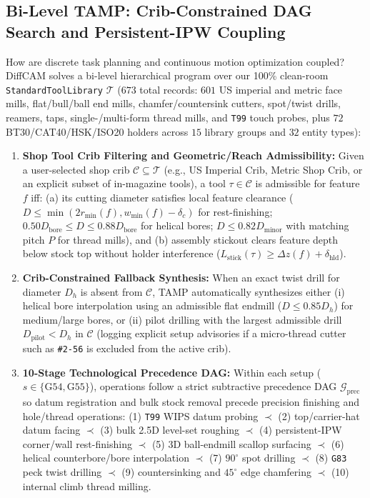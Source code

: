 \documentclass[conference]{IEEEtran}
\begin{document}
\subsection{Bi-Level TAMP: Crib-Constrained DAG Search and Persistent-IPW Coupling}
\label{sec:tamp}
How are discrete task planning and continuous motion optimization coupled? DiffCAM solves a bi-level hierarchical program over our 100\% clean-room \texttt{StandardToolLibrary} $\mathcal{T}$ ($673$ total records: $601$ US imperial and metric face mills, flat/bull/ball end mills, chamfer/countersink cutters, spot/twist drills, reamers, taps, single-/multi-form thread mills, and \texttt{T99} touch probes, plus $72$ BT30/CAT40/HSK/ISO20 holders across $15$ library groups and $32$ entity types):
\begin{enumerate}
  \item \textbf{Shop Tool Crib Filtering and Geometric/Reach Admissibility:} Given a user-selected shop crib $\mathcal{C} \subseteq \mathcal{T}$ (e.g., US Imperial Crib, Metric Shop Crib, or an explicit subset of in-magazine tools), a tool $\tau \in \mathcal{C}$ is admissible for feature $f$ iff: (a) its cutting diameter satisfies local feature clearance ($D \le \min(2 r_{\min}(f), w_{\min}(f) - \delta_c)$ for rest-finishing; $0.50 D_{\text{bore}} \le D \le 0.88 D_{\text{bore}}$ for helical bores; $D \le 0.82 D_{\text{minor}}$ with matching pitch $P$ for thread mills), and (b) assembly stickout clears feature depth below stock top without holder interference ($L_{\text{stick}}(\tau) \ge \Delta z(f) + \delta_{\text{hld}}$).
  \item \textbf{Crib-Constrained Fallback Synthesis:} When an exact twist drill for diameter $D_h$ is absent from $\mathcal{C}$, TAMP automatically synthesizes either (i) helical bore interpolation using an admissible flat endmill ($D \le 0.85 D_h$) for medium/large bores, or (ii) pilot drilling with the largest admissible drill $D_{\text{pilot}} < D_h$ in $\mathcal{C}$ (logging explicit setup advisories if a micro-thread cutter such as \texttt{\#2-56} is excluded from the active crib).
  \item \textbf{10-Stage Technological Precedence DAG:} Within each setup ($s \in \{\text{G54}, \text{G55}\}$), operations follow a strict subtractive precedence DAG $\mathcal{G}_{\text{prec}}$ so datum registration and bulk stock removal precede precision finishing and hole/thread operations: (1) \texttt{T99} WIPS datum probing $\prec$ (2) top/carrier-hat datum facing $\prec$ (3) bulk 2.5D level-set roughing $\prec$ (4) persistent-IPW corner/wall rest-finishing $\prec$ (5) 3D ball-endmill scallop surfacing $\prec$ (6) helical counterbore/bore interpolation $\prec$ (7) $90^\circ$ spot drilling $\prec$ (8) \texttt{G83} peck twist drilling $\prec$ (9) countersinking and $45^\circ$ edge chamfering $\prec$ (10) internal climb thread milling.

\end{enumerate}
\end{document}
